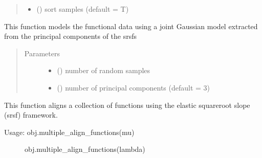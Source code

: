 \documentclass[letterpaper,10pt,english]{sphinxmanual}
\begin{document}
\begin{fulllineitems}
\begin{fulllineitems}
\begin{quote}
\begin{description}
\begin{itemize}
\item {} 
 () \textendash{} sort samples (default = T)

\end{itemize}

\end{description}\end{quote}

\end{fulllineitems}


\begin{fulllineitems}
\label{\detokenize{time_warping:time_warping.fdawarp.joint_gauss_model}}
This function models the functional data using a joint Gaussian model
extracted from the principal components of the srsfs
\begin{quote}\begin{description}
\item[{Parameters}] \leavevmode\begin{itemize}
\item {} 
 () \textendash{} number of random samples

\item {} 
 () \textendash{} number of principal components (default = 3)

\end{itemize}

\end{description}\end{quote}

\end{fulllineitems}


\begin{fulllineitems}
\label{\detokenize{time_warping:time_warping.fdawarp.multiple_align_functions}}
This function aligns a collection of functions using the elastic square\sphinxhyphen{}root
slope (srsf) framework.
\begin{description}
\item[{Usage:  obj.multiple\_align\_functions(mu)}] \leavevmode
obj.multiple\_align\_functions(lambda)


\end{description}
\end{fulllineitems}
\end{fulllineitems}
\end{document}
